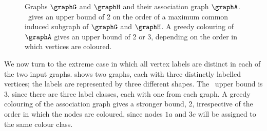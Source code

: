 \begin{figure}[htb]
\centering
{}
\qquad\quad
{}
\qquad\quad
{}
\qquad

\caption{Graphs $\graphG$ and $\graphH$ and their association graph $\graphA$.  \McSplit\
    gives an upper bound of 2 on the order of a maximum common induced subgraph
    of $\graphG$ and $\graphH$.  A greedy colouring of $\graphA$
    gives an upper bound of 2 or
    3, depending on the order in which vertices are coloured.}
\label{fig:mcsplit-better-bound}
\end{figure}

We now turn to the extreme case in which all vertex labels are distinct
in each of the two input graphs.  \Cref{fig:clique-bound-labelled} shows
two graphs, each with three distinctly labelled vertices; the labels
are represented by three different shapes.  The \McSplit\ upper bound is 3,
since there are three label classes, each with one from each graph.
A greedy colouring of the association graph gives a stronger bound, 2,
irrespective of the order in which the nodes are coloured, since
nodes $1a$ and $3c$ will be assigned to the same colour class.

